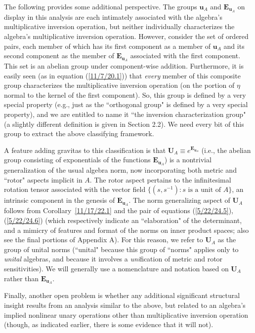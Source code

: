 \documentclass{amsart}
\numberwithin{equation}{section}
\theoremstyle{definition}
\numberwithin{theorem}{section}
\begin{document}
   The following provides some additional perspective. The groups $\mathbf{u}_A$ and $\mathbf{E}_{\mathbf{u}_A}$ on display in this analysis are each intimately associated with the algebra's multiplicative inversion operation, but neither individually characterizes the algebra's multiplicative inversion operation.  However, consider the set of ordered pairs, each member of which has its first component as a member of $\mathbf{u}_A$ and its second component as the member of $\mathbf{E}_{\mathbf{u}_A}$ associated with the first component.  This set is an abelian group under component-wise addition.  Furthermore, it is easily seen (as in equation (\ref{11/7/20.1})) that {\it every} member of this composite group characterizes the multiplicative inversion operation (on the portion of $\eta$ normal to the kernel of the first component).  So, this group is defined by a very special property (e.g., just as the ``orthogonal group" is defined by a very special property), and we are entitled to name it ``the inversion characterization group" (a slightly different definition is given in Section 2.2).   We need every bit of this group to extract the above classifying framework.
 
A feature adding gravitas to this classification is that $\mathbf{U}_A\equiv e^{\mathbf{E}_{\mathbf{u}_A}}$ (i.e., the abelian group consisting of exponentials of the functions $\mathbf{E}_{\mathbf{u}_A}$) is a nontrivial generalization of the usual algebra norm, now incorporating both metric and ``rotor" aspects implicit in $A$.  The rotor aspect pertains to the infinitesimal rotation tensor associated with the vector field $\{(s,s^{-1}):s \mbox{ is a unit of } A\}$, an intrinsic component in the genesis of $\mathbf{E}_{\mathbf{u}_A}$.  The norm generalizing aspect of $\mathbf{U}_A$ follows from \mbox{Corollary \ref{11/17/22.1}} and the pair of equations (\ref{5/22/24.5}), (\ref{5/22/24.6}) (which respectively indicate an ``elaboration" of the determinant, and a mimicry of features and format of the norms on inner product spaces; also see the final portions of Appendix A).  For this reason, we refer to $\mathbf{U}_A$ as the group of unital norms (``unital" because this group of ``norms" applies only to {\it unital} algebras, and because it involves a {\it uni}fication of metric and rotor sensitivities).    We will generally use a nomenclature and notation based on $\mathbf{U}_A$ rather than $\mathbf{E}_{\mathbf{u}_A}$.

Finally, another open problem is whether any additional significant structural insight results from an analysis similar to the above, but related to an algebra's implied nonlinear unary operations other than multiplicative inversion operation (though, as indicated earlier, there is some evidence that it will not).
 
\end{document}
